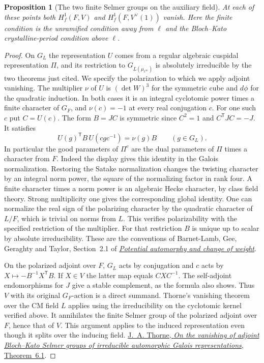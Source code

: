 \documentclass[a4paper,11pt]{article}
\newtheorem{proposition}{Proposition}[section]
\theoremstyle{definition}
\theoremstyle{remark}
\numberwithin{equation}{section}
\begin{document}
\begin{proposition}[The two finite Selmer groups on the auxiliary field]
\leavevmode\label{prop:seedadjoints580}
At each of these points both \(H^1_f(F,V)\) and
\(H^1_f(F,V^\vee(1))\) vanish. Here the finite condition is the
unramified condition away from \(\ell\) and the Bloch--Kato
crystalline-period condition above \(\ell\).
\end{proposition}
\begin{proof}
On \(G_L\) the representation \(U\) comes from a regular algebraic
cuspidal representation \(\Pi\), and its restriction to
\(G_{L(\mu_{\ell^\infty})}\) is absolutely irreducible by the two
theorems just cited. We specify the polarization to which we apply
adjoint vanishing. The multiplier \(\nu\) of \(U\) is
\((\det W)^3\) for the symmetric cube and \(d\phi\) for the quadratic
induction. In both cases it is an integral cyclotomic power times
a finite character of \(G_F\), and \(\nu(c)=-1\) at every real
conjugation \(c\). For one such \(c\) put \(C=U(c)\). The form
\(B=JC\) is symmetric since \(C^2=1\) and \(C^{\mathsf T}JC=-J\).
It satisfies
\[
 U(g)^{\mathsf T}B\,U(cgc^{-1})=\nu(g)B \qquad(g\in G_L).
\]
In particular the good parameters of \(\Pi^c\) are the dual
parameters of \(\Pi\) times a character from \(F\). Indeed the
display gives this identity in the Galois normalization. Restoring
the Satake normalization changes the twisting character by an
integral norm power, the square of the normalizing factor in
rank four. A finite character times a norm power is an algebraic
Hecke character, by class field theory. Strong multiplicity one
gives the corresponding global identity. One can normalize the
real sign of the polarizing character by the quadratic character
of \(L/F\), which is trivial on norms from \(L\).
This verifies polarizability with the specified restriction of
the multiplier. For that restriction \(B\) is unique up to
scalar by absolute irreducibility. These are the conventions
of Barnet-Lamb, Gee, Geraghty and Taylor, Section~2.1 of
\href{https://annals.math.princeton.edu/2014/179-2/p03}
{\emph{Potential automorphy and change of weight}}.

On the polarized adjoint over \(F\), \(G_L\) acts by conjugation
and \(c\) acts by \(X\mapsto-B^{-1}X^{\mathsf T}B\). If \(X\in V\)
the latter map equals \(CXC^{-1}\). The self-adjoint endomorphisms
for \(J\) give a stable complement, as the formula also shows.
Thus \(V\) with its original \(G_F\)-action is a direct summand.
Thorne's vanishing theorem over the CM field \(L\) applies using
the irreducibility on the cyclotomic kernel verified above. It
annihilates the finite Selmer group of the polarized adjoint over
\(F\), hence that of \(V\). This argument applies to the induced
representation even though it splits over the inducing field.
\href{https://arxiv.org/pdf/2207.04925}{J.~A. Thorne,
\emph{On the vanishing of adjoint Bloch--Kato Selmer groups of
irreducible automorphic Galois representations}, Theorem~6.1}.


\end{proof}
\end{document}
